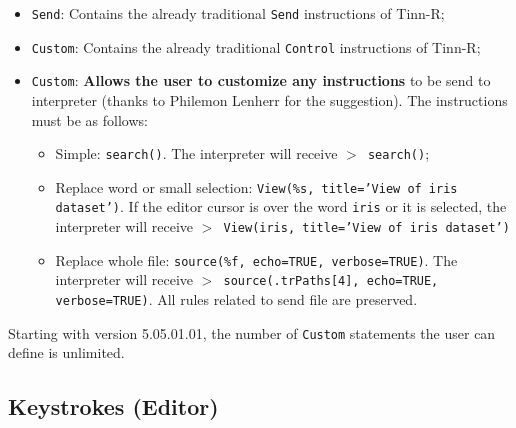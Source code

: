 \begin{itemize}
\item \texttt{Send}: Contains the already traditional \texttt{Send} instructions of Tinn-R;
\item \texttt{Custom}: Contains the already traditional \texttt{Control} instructions of Tinn-R;
\item \texttt{Custom}: \textbf{Allows the user to customize any instructions} to be send to \RR{} interpreter (thanks to Philemon Lenherr for the suggestion). The instructions must be as follows:
 \begin{itemize}
 \item Simple: \texttt{search()}. The \RR{} interpreter will receive \texttt{$>$ search()};
 \item Replace word or small selection: \texttt{View(\%s, title='View of iris dataset')}.
   If the editor cursor is over the word \texttt{iris} or it is selected,
   the \RR{} interpreter will receive \texttt{$>$ View(iris, title='View of iris dataset')}
 \item Replace whole file: \texttt{source(\%f, echo=TRUE, verbose=TRUE)}.
   The \RR{} interpreter will receive \texttt{$>$ source(.trPaths[4], echo=TRUE, verbose=TRUE)}.
   All rules related to send file are preserved.
 \end{itemize}
\end{itemize}

Starting with version 5.05.01.01, the number of \texttt{Custom} statements the user can define is unlimited.


\hypertarget{dlg_keystrokes_editor}{}
\subsection{Keystrokes (Editor)}

